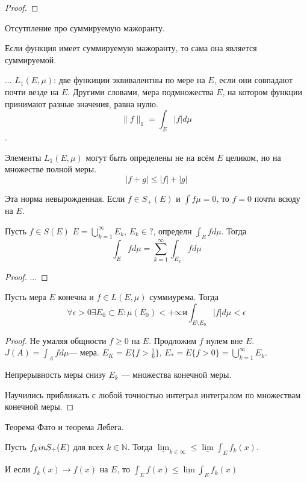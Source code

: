 \begin{proof}

\end{proof}
Отсутпление про суммируемую мажоранту.

Если функция имеет суммируемую мажоранту, то сама она является суммируемой.

...
$L_1(E, \mu)$:
две функиции эквивалентны по мере на $E$, если они совпадают почти везде на $E$.
Другими словами, мера подмножества $E$, на котором функции принимают разные значения, равна нулю.
\[ \| f \|_1 = \int_E |f|d\mu \].

Элементы $L_1(E, \mu)$ могут быть определены не на всём $E$ целиком, но на множестве полной меры.
\[ |f+g| \leqslant |f| + |g| \]

Эта норма невырожденная. 
Если $f\in S_{+}(E)$ и $\int f \mu = 0$, то $f = 0$ почти всюду на $E$. 

\begin{theorem}
Пусть $f\in S(E)$ $E = \bigcup_{k=1}^\infty E_k$, 
$E_k \in ?$, определн $\int_E f d\mu$. 
Тогда 
\[ 
\int_E f d\mu = \sum_{k=1}^\infty \int_{E_k} f d\mu
\]
\end{theorem}

\begin{proof}
...
\end{proof}

\begin{theorem}

Пусть мера $E$ конечна и $f\in L(E, \mu)$ суммиурема.
Тогда 
\[
    \forall \epsilon> 0 \exists E_0 \subset E: \mu(E_0) < +\infty \text{и} \int_{E\setminus E_0} |f| d\mu < \epsilon
\]  
\end{theorem}

\begin{proof}
Не умаляя общности $f \geqslant 0$ на $E$. 
Продложим $f$ нулем вне $E$. $J(A) = \int_A f d\mu$--- мера.
$E_K = E\{ f > \frac{1}{k}\}$, $E_* = E\{f > 0\} = \bigcup_{k=1}^\infty E_k$.

Непрерывность меры снизу
$E_k$ --- множества конечной меры.

Научились приближать с любой точностью интеграл интегралом по множествам конечной меры.
\end{proof}

Теорема Фато и теорема Лебега.
\begin{theorem}
    Пусть $f_k\\in S_+(E)$ для всех $k\in \mathbb{N}$.
    Тогда $\underline{\lim}_{k\in \infty} \leqslant \underline{\lim}\int_E f_k(x)$. 

    И если $f_k(x) \to f(x)$ на $E$, то $\int_E f(x) \leqslant \underline{\lim} \int_E f_k(x)$
\end{theorem}

